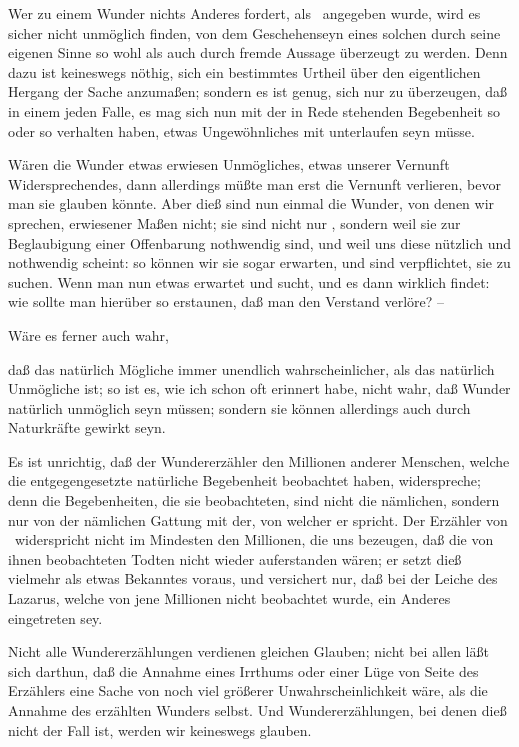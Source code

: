  Wer zu einem Wunder nichts Anderes fordert, als \ angegeben wurde, wird es sicher nicht unmöglich finden, von dem Geschehenseyn eines solchen durch seine eigenen Sinne so wohl als auch durch fremde Aussage überzeugt zu werden. Denn dazu ist keineswegs nöthig, sich ein bestimmtes Urtheil über den eigentlichen Hergang der Sache anzumaßen; sondern es ist genug, sich nur zu überzeugen, daß in einem jeden Falle, es mag sich nun mit der in Rede stehenden Begebenheit so oder so verhalten haben, etwas Ungewöhnliches mit unterlaufen seyn müsse. 
\begin{aufzb}
\item Wären die Wunder etwas erwiesen Unmögliches, etwas unserer Vernunft Widersprechendes, dann allerdings müßte man erst die Vernunft verlieren, bevor man sie glauben könnte. Aber dieß sind nun einmal die Wunder, von denen wir sprechen, erwiesener Maßen nicht; sie sind nicht nur , sondern weil sie zur Beglaubigung einer Offenbarung nothwendig sind, und weil uns diese nützlich und nothwendig scheint: so können wir sie sogar erwarten, und sind verpflichtet, sie zu suchen. Wenn man nun etwas erwartet und sucht, und es dann wirklich findet: wie sollte man hierüber so erstaunen, daß man den Verstand verlöre? -- 
\item Wäre es ferner auch wahr,
\begin{aufzc}
\item daß das natürlich Mögliche immer unendlich wahrscheinlicher, als das natürlich Unmögliche ist; so ist es, wie ich schon oft erinnert habe, nicht wahr, daß Wunder natürlich unmöglich seyn müssen; sondern sie können allerdings auch durch Naturkräfte gewirkt seyn.~
\item Es ist unrichtig, daß der Wundererzähler den Millionen anderer Menschen, welche die entgegengesetzte natürliche Begebenheit beobachtet haben, widerspreche; denn die Begebenheiten, die sie beobachteten, sind nicht die nämlichen, sondern nur von der nämlichen Gattung mit der, von welcher er spricht. Der Erzähler von \ widerspricht nicht im Mindesten den Millionen, die uns bezeugen, daß die von ihnen beobachteten Todten nicht wieder auferstanden wären; er setzt dieß vielmehr als etwas Bekanntes voraus, und versichert nur, daß bei der Leiche des Lazarus, welche von jene Millionen nicht beobachtet wurde, ein Anderes eingetreten sey.
\item Nicht alle Wundererzählungen verdienen gleichen Glauben; nicht bei allen läßt sich darthun, daß die Annahme eines Irrthums oder einer Lüge von Seite des Erzählers eine Sache von noch viel größerer Unwahrscheinlichkeit wäre, als die Annahme des erzählten Wunders selbst. Und Wundererzählungen, bei denen dieß nicht der Fall ist, werden wir keineswegs glauben.
\end{aufzc}
\end{aufzb}

